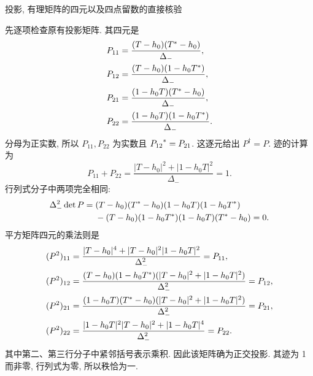 \par\medskip\noindent 投影, 有理矩阵的四元以及四点留数的直接核验\par
先逐项检查原有投影矩阵.
其四元是
\begin{equation*}
\begin{aligned}
P_{11}&=\dfrac{(T-h_0)({T}^{*}-h_0)}{\Delta_-},\\
P_{12}&=\dfrac{(T-h_0)(1-h_0{T}^{*})}{\Delta_-},\\
P_{21}&=\dfrac{(1-h_0T)({T}^{*}-h_0)}{\Delta_-},\\
P_{22}&=\dfrac{(1-h_0T)(1-h_0{T}^{*})}{\Delta_-}.
\end{aligned}
\end{equation*}
分母为正实数, 所以 $P_{11},P_{22}$ 为实数且
${P_{12}}^{*}=P_{21}$.
这逐元给出 $P^\dagger=P$.
迹的计算为
\begin{equation*}
P_{11}+P_{22}
=\dfrac{|T-h_0|^2+|1-h_0T|^2}{\Delta_-}=1.
\end{equation*}
行列式分子中两项完全相同:
\begin{equation*}
\begin{aligned}
\Delta_-^2\det P
={}&(T-h_0)({T}^{*}-h_0)(1-h_0T)(1-h_0{T}^{*})\\
&-(T-h_0)(1-h_0{T}^{*})(1-h_0T)({T}^{*}-h_0)=0.
\end{aligned}
\end{equation*}
平方矩阵四元的乘法则是
\begin{equation*}
\begin{aligned}
(P^2)_{11}
&=\dfrac{|T-h_0|^4+|T-h_0|^2|1-h_0T|^2}{\Delta_-^2}
=P_{11},\\
(P^2)_{12}
&=\dfrac{(T-h_0)(1-h_0{T}^{*})
(|T-h_0|^2+|1-h_0T|^2)}{\Delta_-^2}
=P_{12},\\
(P^2)_{21}
&=\dfrac{(1-h_0T)({T}^{*}-h_0)
(|T-h_0|^2+|1-h_0T|^2)}{\Delta_-^2}
=P_{21},\\
(P^2)_{22}
&=\dfrac{|1-h_0T|^2|T-h_0|^2+|1-h_0T|^4}{\Delta_-^2}
=P_{22}.
\end{aligned}
\end{equation*}
其中第二、第三行分子中紧邻括号表示乘积.
因此该矩阵确为正交投影.
其迹为 1 而非零, 行列式为零, 所以秩恰为一.


